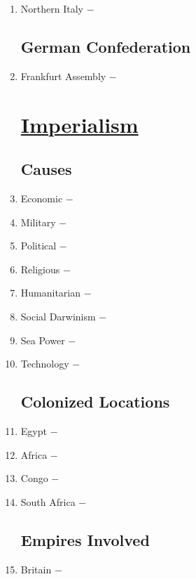 \documentclass[12pt]{article}
\begin{document}
\begin{enumerate}
\item Northern Italy $-$ 

\subsection{German Confederation}


\item Frankfurt Assembly $-$ 

\section{\underline{Imperialism}}

\subsection{Causes}

\item Economic $-$ 

\item Military $-$ 

\item Political $-$ 

\item Religious $-$ 

\item Humanitarian $-$ 

\item Social Darwinism $-$ 

\item Sea Power $-$ 

\item Technology $-$ 

\subsection{Colonized Locations}

\item Egypt $-$

\item Africa $-$ 

\item Congo $-$ 

\item South Africa $-$ 

\subsection{Empires Involved}

\item Britain $-$ 


\end{enumerate}
\end{document}
